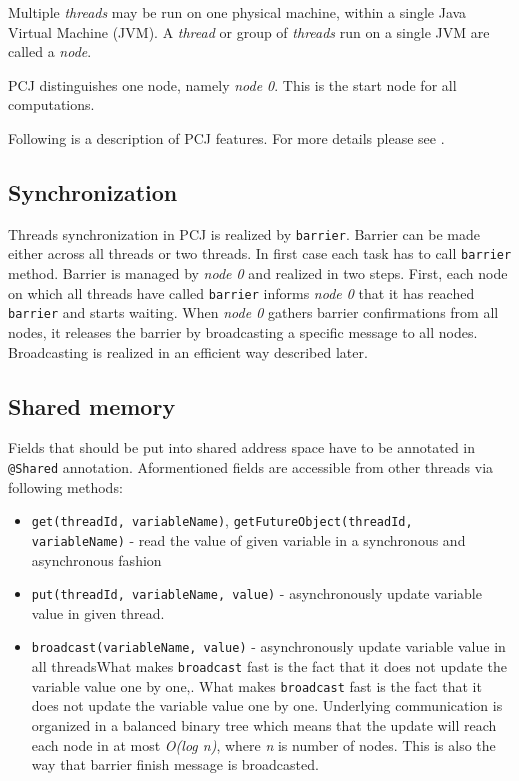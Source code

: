\documentclass{llncs}
\newcommand{\inlinecode}{\texttt}
\begin{document}
Multiple \emph{threads} may be run on one physical machine, within a single Java Virtual Machine (JVM).
A \emph{thread} or group of \emph{threads} run on a single JVM are called a \emph{node}.

PCJ distinguishes one node, namely \emph{node 0}. This is the start node for all computations.

Following is a description of PCJ features. For more details please see \cite{pcj-manual}.
\subsection{Synchronization}\label{sync}
Threads synchronization in PCJ is realized by \inlinecode{barrier}.
Barrier can be made either across all threads or two threads.
In first case each task has to call \inlinecode{barrier} method.
Barrier is managed by \emph{node 0} and realized in two steps.
First, each node on which all threads have called \inlinecode{barrier} informs \emph{node 0} that it has reached \inlinecode{barrier} and starts waiting.
When \emph{node 0} gathers barrier confirmations from all nodes, it releases the barrier by broadcasting a specific message to all nodes.
Broadcasting is realized in an efficient way described later.
\subsection{Shared memory}
Fields that should be put into shared address space have to be annotated in \inlinecode{@Shared} annotation.
Aformentioned fields are accessible from other threads via following methods:
\vspace{-2mm}
\begin{itemize}
\item\inlinecode{get(threadId, variableName)}, \inlinecode{getFutureObject(threadId, variableName)} - read the value of given variable
in a synchronous and asynchronous fashion
\item\inlinecode{put(threadId, variableName, value)} - asynchronously update variable value in given thread.
\item\inlinecode{broadcast(variableName, value)} - asynchronously update variable value in all threadsWhat makes \inlinecode{broadcast} fast is the fact that it does not update the variable value one by one,.
   What makes \inlinecode{broadcast} fast is the fact that it does not update the variable value one by one.
   Underlying communication is organized in a balanced binary tree which means that the update will reach each node in at most \emph{O(log n)}, where \emph{n} is number of nodes.
   This is also the way that barrier finish message is broadcasted.

\end{itemize}
\end{document}
